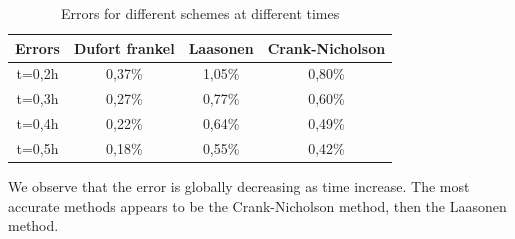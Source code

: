 \documentclass{article}
\begin{document}
        \begin{table}[H]
            \centering
            \caption{Errors for different schemes at different times}
            \begin{tabular}{|c|c|c|c|}
            \hline
            Errors & Dufort frankel & Laasonen & Crank-Nicholson \\ \hline
            t=0,2h & 0,37\%         & 1,05\%   & 0,80\%          \\ \hline
            t=0,3h & 0,27\%         & 0,77\%   & 0,60\%          \\ \hline
            t=0,4h & 0,22\%         & 0,64\%   & 0,49\%          \\ \hline
            t=0,5h & 0,18\%         & 0,55\%   & 0,42\%          \\ \hline
            \end{tabular}
        \end{table}

        We observe that the error is globally decreasing as time increase. The most accurate methods appears to 
        be the Crank-Nicholson method, then the Laasonen method.
\end{document}
